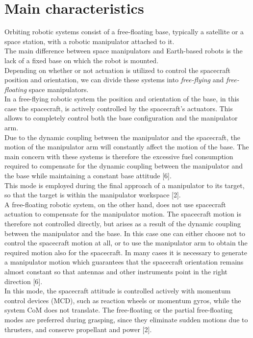 \documentclass[a4paper,12pt,oneside]{report}
\begin{document}
\section{Main characteristics}
Orbiting robotic systems consist of a free-floating base, typically a satellite or a space station, with a robotic manipulator attached to it.\\
The main difference between space manipulators and Earth-based robots is the lack of a fixed base on which the robot is mounted.\\
Depending on whether or not actuation is utilized to control the spacecraft position and orientation, we can divide these systems into \textit{free-flying} and \textit{free-floating} space manipulators. \\
In a free-flying robotic system the position and orientation of the base, in this case the spacecraft, is actively controlled by the spacecraft’s actuators. This allows to completely control both the base configuration and the manipulator arm.\\ 
Due to the dynamic coupling between the manipulator and the spacecraft, the motion of the manipulator arm will constantly affect the motion of the base. The main concern with these systems is therefore the excessive fuel consumption required to compensate for the dynamic coupling between the manipulator and the base while maintaining a constant base attitude [6].\\
This mode is employed during the final approach of a manipulator to its target, so that the target is within the manipulator workspace [2].\\
A free-floating robotic system, on the other hand, does not use spacecraft actuation to compensate for the manipulator motion. The spacecraft motion is therefore not controlled directly, but arises as a result of the dynamic coupling between the manipulator and the base. In this case one can either choose not to control the spacecraft motion at all, or to use the manipulator arm to obtain the required motion also for the spacecraft. In many cases it is necessary to generate a manipulator motion which guarantees that the spacecraft orientation remains almost constant so that antennas and other instruments point in the right direction [6].\\
In this mode, the spacecraft attitude is controlled actively with momentum control devices (MCD), such as reaction wheels or momentum gyros, while the system CoM does not translate. The free-floating or the partial free-floating modes are preferred during grasping, since they eliminate sudden motions due to thrusters, and conserve propellant and power [2].\\
\end{document}
